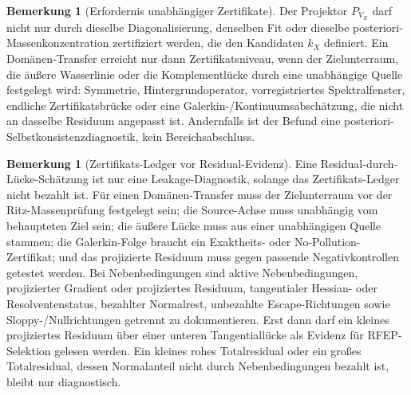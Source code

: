 \documentclass[11pt,a4paper]{article}
\theoremstyle{plain}
\theoremstyle{definition}
\newtheorem{remark}[theorem]{Bemerkung}
\begin{document}
\begin{remark}[Erfordernis unabhängiger Zertifikate]
\label{rem:independent-certificate}
Der Projektor $P_{V_X}$ darf nicht nur durch dieselbe Diagonalisierung,
denselben Fit oder dieselbe posteriori-Massenkonzentration zertifiziert
werden, die den Kandidaten $k_X$ definiert. Ein Domänen-Transfer erreicht
nur dann Zertifikatsniveau, wenn der Zielunterraum, die äußere Wasserlinie
oder die Komplementlücke durch eine unabhängige Quelle festgelegt wird:
Symmetrie, Hintergrundoperator, vorregistriertes Spektralfenster, endliche
Zertifikatsbrücke oder eine Galerkin-/Kontinuumsabschätzung, die nicht an
dasselbe Residuum angepasst ist. Andernfalls ist der Befund eine
posteriori-Selbstkonsistenzdiagnostik, kein Bereichsabschluss.
\end{remark}

\begin{remark}[Zertifikats-Ledger vor Residual-Evidenz]
\label{rem:certificate-ledger}
Eine Residual-durch-Lücke-Schätzung ist nur eine Leakage-Diagnostik,
solange das Zertifikats-Ledger nicht bezahlt ist. Für einen
Domänen-Transfer muss der Zielunterraum vor der Ritz-Massenprüfung
festgelegt sein; die Source-Achse muss unabhängig vom behaupteten Ziel
sein; die äußere Lücke muss aus einer unabhängigen Quelle stammen; die
Galerkin-Folge braucht ein Exaktheits- oder No-Pollution-Zertifikat; und
das projizierte Residuum muss gegen passende Negativkontrollen getestet
werden. Bei Nebenbedingungen sind aktive Nebenbedingungen, projizierter
Gradient oder projiziertes Residuum, tangentialer Hessian- oder
Resolventenstatus, bezahlter Normalrest, unbezahlte Escape-Richtungen
sowie Sloppy-/Nullrichtungen getrennt zu dokumentieren. Erst dann darf
ein kleines projiziertes Residuum über einer unteren Tangentiallücke als
Evidenz für RFEP-Selektion gelesen werden. Ein kleines rohes
Totalresidual oder ein großes Totalresidual, dessen Normalanteil nicht
durch Nebenbedingungen bezahlt ist, bleibt nur diagnostisch.
\end{remark}
\end{document}
